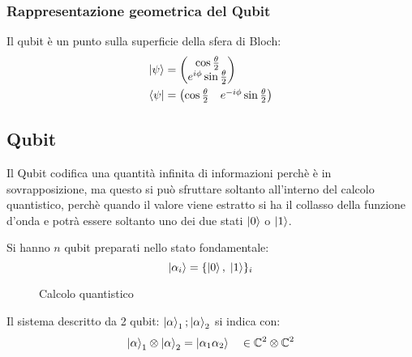 \documentclass[a4paper]{article}
\begin{document}
\subsubsection{Rappresentazione geometrica del Qubit}
Il qubit è un punto sulla superficie della sfera di Bloch:
\label{17-01-D1}
\[
  \begin{aligned}
    \ket{\psi} &= \begin{pmatrix} 
      \cos \frac{\theta }{2}\\
      e^{i \phi } \sin \frac{\theta }{2}
    \end{pmatrix} \\
    \bra{\psi} &= \begin{pmatrix} 
      \cos \frac{\theta }{2} & e^{-i \phi } \sin \frac{\theta }{2}
    \end{pmatrix}
  \end{aligned}
\] 

\subsection{Qubit}
Il Qubit codifica una quantità infinita di informazioni perchè è in sovrapposizione, ma
questo si può sfruttare soltanto all'interno del calcolo quantistico, perchè quando il
valore viene estratto si ha il collasso della funzione d'onda e potrà essere soltanto uno
dei due stati \( \ket{0} \) o \( \ket{1} \).

\vspace{1em}
\noindent
Si hanno \( n \) qubit preparati nello stato fondamentale:
\[
  \ket{\alpha_i} = \{\ket{0}, \; \ket{1}\}_i
\] 
\begin{figure}[H]
  \centering
  \caption{Calcolo quantistico}
\end{figure}
\noindent
Il sistema descritto da 2 qubit: $\ket{\alpha}_1 ; \ket{\alpha}_2$ si indica con:
\[
  \ket{\alpha}_1 \otimes \ket{\alpha}_2 = \ket{\alpha_1 \alpha_2} \quad \in \mathbb{C}^2 \otimes \mathbb{C}^2
\] 
\end{document}
